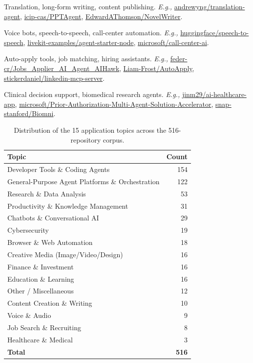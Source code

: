 \begin{description}[leftmargin=*, itemsep=2pt, font=\normalfont\bfseries]
  \item[Content Creation \& Writing] Translation, long-form writing, content publishing. \textit{E.g.,} \url{andrewyng/translation-agent}, \url{icip-cas/PPTAgent}, \url{EdwardAThomson/NovelWriter}.
  \item[Voice \& Audio] Voice bots, speech-to-speech, call-center automation. \textit{E.g.,} \url{huggingface/speech-to-speech}, \url{livekit-examples/agent-starter-node}, \url{microsoft/call-center-ai}.
  \item[Job Search \& Recruiting] Auto-apply tools, job matching, hiring assistants. \textit{E.g.,} \url{feder-cr/Jobs_Applier_AI_Agent_AIHawk}, \url{Liam-Frost/AutoApply}, \url{stickerdaniel/linkedin-mcp-server}.
  \item[Healthcare \& Medical] Clinical decision support, biomedical research agents. \textit{E.g.,} \url{jinm29/ai-healthcare-app}, \url{microsoft/Prior-Authorization-Multi-Agent-Solution-Accelerator}, \url{snap-stanford/Biomni}.
\end{description}

\begin{table}[htbp]
\centering
\small
\caption{Distribution of the 15 application topics across the 516-repository corpus.}
\label{tab:topic-counts}
\begin{tabular}{@{}lr@{}}
\toprule
\textbf{Topic} & \textbf{Count} \\
\midrule
Developer Tools \& Coding Agents & 154 \\
General-Purpose Agent Platforms \& Orchestration & 122 \\
Research \& Data Analysis & 53 \\
Productivity \& Knowledge Management & 31 \\
Chatbots \& Conversational AI & 29 \\
Cybersecurity & 19 \\
Browser \& Web Automation & 18 \\
Creative Media (Image/Video/Design) & 16 \\
Finance \& Investment & 16 \\
Education \& Learning & 16 \\
Other / Miscellaneous & 12 \\
Content Creation \& Writing & 10 \\
Voice \& Audio & 9 \\
Job Search \& Recruiting & 8 \\
Healthcare \& Medical & 3 \\
\midrule
\textbf{Total} & \textbf{516} \\
\bottomrule
\end{tabular}
\end{table}


